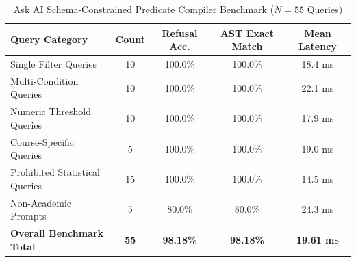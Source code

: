 \begin{table}[h]
\centering
\small
\caption{Ask AI Schema-Constrained Predicate Compiler Benchmark ($N=55$ Queries)}
\label{tab:ask_ai}
\begin{tabular}{lcccc}
\toprule
\textbf{Query Category} & \textbf{Count} & \textbf{Refusal Acc.} & \textbf{AST Exact Match} & \textbf{Mean Latency} \\
\midrule
Single Filter Queries & 10 & 100.0\% & 100.0\% & 18.4 ms \\
Multi-Condition Queries & 10 & 100.0\% & 100.0\% & 22.1 ms \\
Numeric Threshold Queries & 10 & 100.0\% & 100.0\% & 17.9 ms \\
Course-Specific Queries & 5 & 100.0\% & 100.0\% & 19.0 ms \\
Prohibited Statistical Queries & 15 & 100.0\% & 100.0\% & 14.5 ms \\
Non-Academic Prompts & 5 & 80.0\% & 80.0\% & 24.3 ms \\
\midrule
\textbf{Overall Benchmark Total} & \textbf{55} & \textbf{98.18\%} & \textbf{98.18\%} & \textbf{19.61 ms} \\
\bottomrule
\end{tabular}
\end{table}
